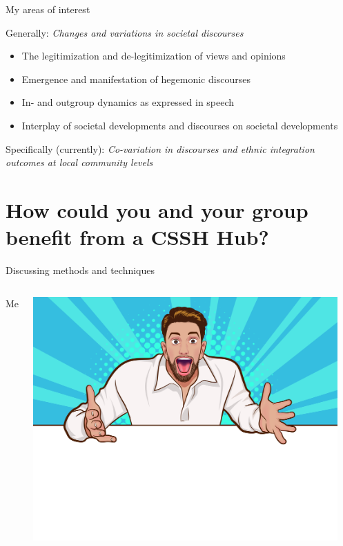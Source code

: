 \documentclass[10pt]{beamer}
\begin{document}
\begin{frame}[fragile]{My areas of interest}

    Generally: \emph{Changes and variations in societal discourses}
    \begin{itemize}
        \item The legitimization and de-legitimization of views and opinions
        \item Emergence and manifestation of hegemonic discourses
        \item In- and outgroup dynamics as expressed in speech
        \item Interplay of societal developments and discourses on societal developments
    \end{itemize}

    Specifically (currently): \emph{Co-variation in discourses and ethnic integration outcomes at local community levels}
    
\end{frame}

\section{How could you and your group benefit from a CSSH Hub?}

\begin{frame}[fragile]{Discussing methods and techniques}  
\begin{columns}[T,onlytextwidth]
        \centering
        Me
        
        \includegraphics[width=0.95\textwidth]{excited}

\end{columns}


\end{frame}
\end{document}

